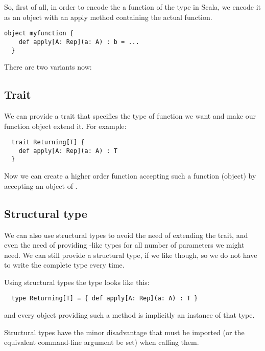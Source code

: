 So, first of all, in order to encode the a function of the type 
in Scala, we encode it as an object with an apply method containing the actual
function.
\begin{lstlisting}[caption=Encoding a universal function]
  object myfunction {
    def apply[A: Rep](a: A) : b = ...
  }
\end{lstlisting}
There are two variants now:

\subsection{Trait}
We can provide a  trait that specifies the type of function we want and make our
function object extend it. For example:
\begin{lstlisting}
  trait Returning[T] {
    def apply[A: Rep](a: A) : T
  }
\end{lstlisting}
Now we can create a higher order function accepting such a function (object)
by accepting an object of .

\subsection{Structural type}
We can also use structural types to avoid the need of extending the trait, and
even the need of providing -like types for all number of parameters
we might need. We can still provide a  structural type, if we like
though, so we do not have to write the complete type every time.

Using structural types the  type looks like this:
\begin{lstlisting}
  type Returning[T] = { def apply[A: Rep](a: A) : T }
\end{lstlisting}
and every object providing such a method is implicitly an instance of that type.

Structural types have the minor disadvantage that 
must be imported (or the equivalent command-line argument be set) when calling them.
